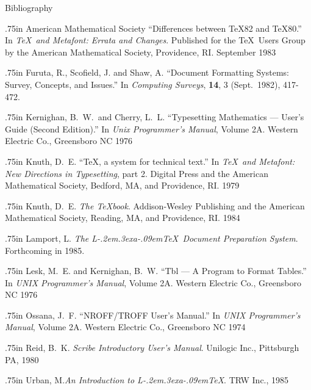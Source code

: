 \vfil\eject
{\parindent=0pt\parskip=10pt
\frenchspacing
\centerline{\twelveb Bibliography}
\vskip 8pt

\def\Hpar{\par\hangindent .75in}
\Hpar
{\csc American Mathematical Society} 
``Differences between \TeX82 and \TeX80.'' In {\sl \TeX\ and Metafont:
Errata and Changes}. Published for the \TeX\ Users Group by the American
Mathematical Society, Providence, RI. September 1983

\Hpar
{\csc Furuta, R., Scofield, J. {\rm and} Shaw, A.} ``Document Formatting
Systems: Survey, Concepts, and Issues.'' In {\sl Computing Surveys\/},
{\bf 14}, 3 (Sept.~1982), 417-472.

\Hpar
{\csc Kernighan, B.~W.~{\rm and} Cherry, L.~L.} ``Typesetting
Mathematics --- User's Guide (Second Edition).'' In {\sl Unix Programmer's
Manual\/}, Volume 2A.  Western Electric Co., Greensboro NC 1976

\Hpar
{\csc Knuth, D.~E.} ``\TeX, a system for technical text.'' In {\sl \TeX\ and
Metafont: New Directions in Typesetting\/}, part 2.  Digital Press
and the American Mathematical Society, Bedford, MA, and
Providence, RI.  1979

\Hpar
{\csc Knuth, D.~E.}
{\sl The \TeX book\/}.  Addison-Wesley Publishing and the
American Mathematical Society, Reading, MA, and Providence, RI.
1984

\Hpar
{\csc Lamport, L.}
{\sl The
L\kern-.2em\raise.3ex\hbox{\csc a}\kern-.09em\TeX\
Document Preparation System}.  Forthcoming in 1985.

\Hpar
{\csc Lesk, M.~E. {\rm and} Kernighan, B.~W.} ``Tbl --- A Program
to Format Tables.'' In {\sl UNIX Programmer's
Manual\/}, Volume 2A.  Western Electric Co., Greensboro NC 1976

\Hpar
{\csc Ossana, J.~F.} ``NROFF/TROFF User's Manual.'' In {\sl UNIX Programmer's
Manual\/}, Volume 2A.  Western Electric Co., Greensboro NC 1974

\Hpar
{\csc Reid, B.~K.} {\sl Scribe Introductory User's Manual\/}.  Unilogic
Inc., Pittsburgh PA, 1980

\Hpar
{\csc Urban, M.}{\sl An Introduction to
L\kern-.2em\raise.3ex\hbox{\csc a}\kern-.09em\TeX}.  TRW Inc., 1985

}
